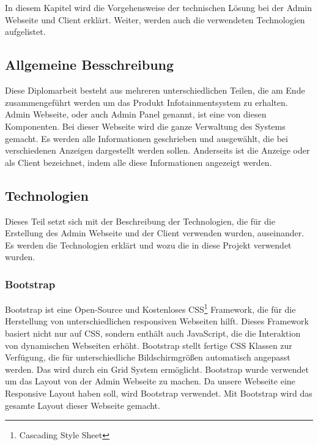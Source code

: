 \chapter{\docname}
\label{\docname}
In diesem Kapitel wird die Vorgehensweise der technischen L\"{o}sung bei der Admin Webseite und Client erkl\"{a}rt. Weiter, werden auch die verwendeten Technologien aufgelistet. 

\section{Allgemeine Besschreibung}

Diese Diplomarbeit besteht aus mehreren unterschiedlichen Teilen, die am Ende zusammengef\"{u}hrt werden um das Produkt Infotainmentsystem zu erhalten. Admin Webseite, oder auch Admin Panel genannt, ist eine von diesen Komponenten. Bei dieser Webseite wird die ganze Verwaltung des Systems gemacht. Es werden alle Informationen geschrieben und ausgew\"{a}hlt, die bei verschiedenen Anzeigen dargestellt werden sollen. Anderseits ist die Anzeige oder als Client bezeichnet, indem alle diese Informationen angezeigt werden. 


\section{Technologien}

Dieses Teil setzt sich mit der Beschreibung der Technologien, die f\"{u}r die Erstellung des Admin Webseite und der Client verwenden wurden, auseinander. Es werden die Technologien erkl\"{a}rt und wozu die in diese Projekt verwendet wurden.



\subsection{Bootstrap}
Bootstrap ist eine Open-Source und Kostenloses CSS\footnote{Cascading Style Sheet} Framework, die f\"{u}r die Herstellung von unterschiedlichen responsiven Webseiten hilft. Dieses Framework basiert nicht nur auf CSS, sondern enth\"{a}lt auch JavaScript, die die Interaktion von dynamischen Webseiten erh\"{o}ht. Bootstrap stellt fertige CSS Klassen zur Verf\"{u}gung, die f\"{u}r unterschiedliche Bildschirmgr\"{o}\ss{}en automatisch angepasst werden. Das wird durch ein Grid System erm\"{o}glicht. Bootstrap wurde verwendet um das Layout von der Admin Webseite zu machen. Da unsere Webseite eine Responsive Layout haben soll, wird Bootstrap verwendet. Mit Bootstrap wird das gesamte Layout dieser Webseite gemacht. \cite{40_bootstrap}


